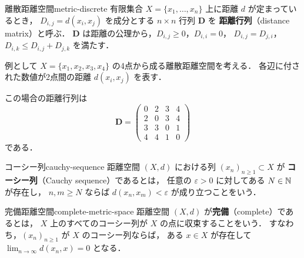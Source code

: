 \begin{example}{離散距離空間}{metric-discrete}
  有限集合 $X = \{x_1, \ldots, x_n\}$ 上に距離 $d$ が定まっているとき，
  $D_{i,j} = d(x_i, x_j)$ を成分とする $n \times n$ 行列 $\mathbf{D}$ を
  \textbf{距離行列}（distance matrix）と呼ぶ．
  $\mathbf{D}$ は距離の公理から，$D_{i,j} \geq 0$，$D_{i,i} = 0$，
  $D_{i,j} = D_{j,i}$，$D_{i,k} \leq D_{i,j} + D_{j,k}$ を満たす．

  例として $X = \{x_1, x_2, x_3, x_4\}$ の4点から成る離散距離空間を考える．
  各辺に付された数値が2点間の距離 $d(x_i, x_j)$ を表す．

  \begin{center}
  \end{center}

  この場合の距離行列は
  \[
    \mathbf{D} =
    \begin{pmatrix}
      0 & 2 & 3 & 4 \\
      2 & 0 & 3 & 4 \\
      3 & 3 & 0 & 1 \\
      4 & 4 & 1 & 0
    \end{pmatrix}
  \]
  である．
\end{example}

\begin{definition}{コーシー列}{cauchy-sequence}
  距離空間 $(X, d)$ における列 $(x_n)_{n \geq 1} \subset X$ が
  \textbf{コーシー列}（Cauchy sequence）であるとは，
  任意の $\varepsilon > 0$ に対してある $N \in \mathbb{N}$ が存在し，
  $n, m \geq N$ ならば $d(x_n, x_m) < \varepsilon$ が成り立つことをいう．
\end{definition}

\begin{definition}{完備距離空間}{complete-metric-space}
  距離空間 $(X, d)$ が\textbf{完備}（complete）であるとは，
  $X$ 上のすべてのコーシー列が $X$ の点に収束することをいう．
  すなわち，$(x_n)_{n \geq 1}$ が $X$ のコーシー列ならば，
  ある $x \in X$ が存在して $\lim_{n \to \infty} d(x_n, x) = 0$ となる．
\end{definition}

